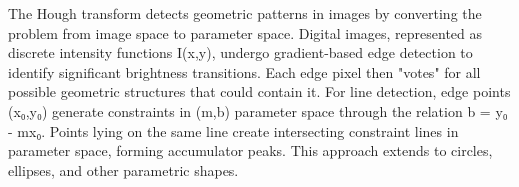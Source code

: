 The Hough transform detects geometric patterns in images by converting the problem from image space to parameter space. Digital images, represented as discrete intensity functions I(x,y), undergo gradient-based edge detection to identify significant brightness transitions. Each edge pixel then "votes" for all possible geometric structures that could contain it. For line detection, edge points (x₀,y₀) generate constraints in (m,b) parameter space through the relation b = y₀ - mx₀. Points lying on the same line create intersecting constraint lines in parameter space, forming accumulator peaks. This approach extends to circles, ellipses, and other parametric shapes.